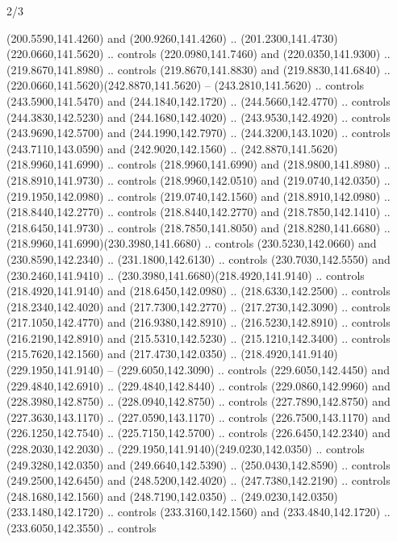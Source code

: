 \begin{flagdescription}{2/3}
\begin{scope}[xshift=0.5\flaglength,yshift=0.5\flagwidth,scale=\flagwidth/259.2]
\begin{scope}[y=0.8pt, x=0.8pt, yscale=-1,shift={(-243,-162)}]
      (200.5590,141.4260) and (200.9260,141.4260) ..
      (201.2300,141.4730)(220.0660,141.5620) .. controls (220.0980,141.7460) and
      (220.0350,141.9300) .. (219.8670,141.8980) .. controls (219.8670,141.8830) and
      (219.8830,141.6840) .. (220.0660,141.5620)(242.8870,141.5620) --
      (243.2810,141.5620) .. controls (243.5900,141.5470) and (244.1840,142.1720) ..
      (244.5660,142.4770) .. controls (244.3830,142.5230) and (244.1680,142.4020) ..
      (243.9530,142.4920) .. controls (243.9690,142.5700) and (244.1990,142.7970) ..
      (244.3200,143.1020) .. controls (243.7110,143.0590) and (242.9020,142.1560) ..
      (242.8870,141.5620)(218.9960,141.6990) .. controls (218.9960,141.6990) and
      (218.9800,141.8980) .. (218.8910,141.9730) .. controls (218.9960,142.0510) and
      (219.0740,142.0350) .. (219.1950,142.0980) .. controls (219.0740,142.1560) and
      (218.8910,142.0980) .. (218.8440,142.2770) .. controls (218.8440,142.2770) and
      (218.7850,142.1410) .. (218.6450,141.9730) .. controls (218.7850,141.8050) and
      (218.8280,141.6680) .. (218.9960,141.6990)(230.3980,141.6680) .. controls
      (230.5230,142.0660) and (230.8590,142.2340) .. (231.1800,142.6130) .. controls
      (230.7030,142.5550) and (230.2460,141.9410) ..
      (230.3980,141.6680)(218.4920,141.9140) .. controls (218.4920,141.9140) and
      (218.6450,142.0980) .. (218.6330,142.2500) .. controls (218.2340,142.4020) and
      (217.7300,142.2770) .. (217.2730,142.3090) .. controls (217.1050,142.4770) and
      (216.9380,142.8910) .. (216.5230,142.8910) .. controls (216.2190,142.8910) and
      (215.5310,142.5230) .. (215.1210,142.3400) .. controls (215.7620,142.1560) and
      (217.4730,142.0350) .. (218.4920,141.9140)(229.1950,141.9140) --
      (229.6050,142.3090) .. controls (229.6050,142.4450) and (229.4840,142.6910) ..
      (229.4840,142.8440) .. controls (229.0860,142.9960) and (228.3980,142.8750) ..
      (228.0940,142.8750) .. controls (227.7890,142.8750) and (227.3630,143.1170) ..
      (227.0590,143.1170) .. controls (226.7500,143.1170) and (226.1250,142.7540) ..
      (225.7150,142.5700) .. controls (226.6450,142.2340) and (228.2030,142.2030) ..
      (229.1950,141.9140)(249.0230,142.0350) .. controls (249.3280,142.0350) and
      (249.6640,142.5390) .. (250.0430,142.8590) .. controls (249.2500,142.6450) and
      (248.5200,142.4020) .. (247.7380,142.2190) .. controls (248.1680,142.1560) and
      (248.7190,142.0350) .. (249.0230,142.0350)(233.1480,142.1720) .. controls
      (233.3160,142.1560) and (233.4840,142.1720) .. (233.6050,142.3550) .. controls

\end{scope}
\end{scope}
\end{flagdescription}
